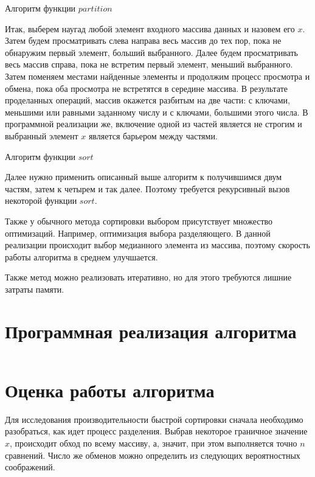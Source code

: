 \documentclass[bachelor, och, labwork]{shiza}
\begin{document}
\begin{center}Алгоритм функции $partition$\end{center}

Итак, выберем наугад любой элемент входного массива данных и назовем его $x$.
Затем будем просматривать слева направа весь массив до тех пор, пока не
обнаружим первый элемент, больший выбранного. Далее будем просматривать весь
массив справа, пока не встретим первый элемент, меньший выбранного.
Затем поменяем местами найденные элементы и продолжим процесс просмотра и обмена,
пока оба просмотра не встретятся в середине массива. В результате 
проделанных операций, массив окажется разбитым на две части: с ключами, меньшими
или равными заданному числу и с ключами, большими этого числа.
В программной реализации же, включение одной из частей является не строгим и 
выбранный элемент $x$ является барьером между частями.

\begin{center}Алгоритм функции $sort$\end{center}

Далее нужно применить описанный выше алгоритм к получившимся двум частям, затем 
к четырем и так далее. Поэтому требуется рекурсивный вызов некоторой функции 
$sort$.

Также у обычного метода сортировки выбором присутствует множество оптимизаций. 
Например, оптимизация выбора разделяющего. В данной реализации происходит выбор 
медианного элемента из массива, поэтому скорость работы алгоритма в среднем 
улучшается.

Также метод можно реализовать итеративно, но для этого требуются лишние затраты
памяти.


\section{Программная реализация алгоритма}

\inputminted[linenos,breaklines=true, fontsize=\small, style=bw]{python}{qs.py}

\section{Оценка работы алгоритма}

Для исследования производительности быстрой сортировки сначала необходимо
разобраться, как идет процесс разделения. Выбрав некоторое граничное значение
$x$, происходит обход по всему массиву, а, значит, при этом выполняется точно
$n$ сравнений. Число же обменов можно определить из следующих
вероятностных соображений.
\end{document}
